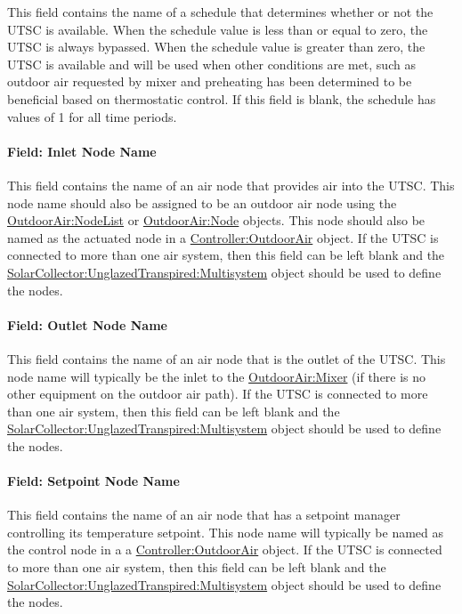 This field contains the name of a schedule that determines whether or not the UTSC is available. When the schedule value is less than or equal to zero, the UTSC is always bypassed. When the schedule value is greater than zero, the UTSC is available and will be used when other conditions are met, such as outdoor air requested by mixer and preheating has been determined to be beneficial based on thermostatic control. If this field is blank, the schedule has values of 1 for all time periods.

\paragraph{Field: Inlet Node Name}\label{field-inlet-node-name-2-003}

This field contains the name of an air node that provides air into the UTSC. This node name should also be assigned to be an outdoor air node using the \hyperref[outdoorairnodelist]{OutdoorAir:NodeList} or \hyperref[outdoorairnode]{OutdoorAir:Node} objects. This node should also be named as the actuated node in a \hyperref[controlleroutdoorair]{Controller:OutdoorAir} object. If the UTSC is connected to more than one air system, then this field can be left blank and the \hyperref[solarcollectorunglazedtranspiredmultisystem]{SolarCollector:UnglazedTranspired:Multisystem} object should be used to define the nodes.

\paragraph{Field: Outlet Node Name}\label{field-outlet-node-name-2-003}

This field contains the name of an air node that is the outlet of the UTSC. This node name will typically be the inlet to the \hyperref[outdoorairmixer]{OutdoorAir:Mixer} (if there is no other equipment on the outdoor air path). If the UTSC is connected to more than one air system, then this field can be left blank and the \hyperref[solarcollectorunglazedtranspiredmultisystem]{SolarCollector:UnglazedTranspired:Multisystem} object should be used to define the nodes.

\paragraph{Field: Setpoint Node Name}\label{field-setpoint-node-name-000}

This field contains the name of an air node that has a setpoint manager controlling its temperature setpoint. This node name will typically be named as the control node in a a \hyperref[controlleroutdoorair]{Controller:OutdoorAir} object. If the UTSC is connected to more than one air system, then this field can be left blank and the \hyperref[solarcollectorunglazedtranspiredmultisystem]{SolarCollector:UnglazedTranspired:Multisystem} object should be used to define the nodes.

